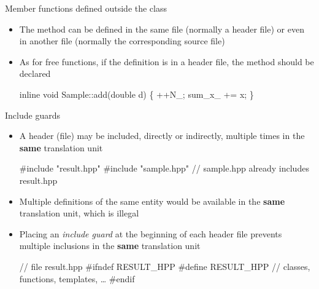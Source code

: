 \begin{frame}[fragile]{Member functions defined outside the class \insertcontinuationtext}

  \begin{itemize}
  \item The method can be defined in the same file (normally a header file) or
    even in another file (normally the corresponding source file)

  \item As for free functions, if the definition is in a header file,
    the method should be declared 

    \begin{codeblock}
\alert{inline} void Sample::add(double d) \{
  ++N_;
  sum_x_ += x;
  \ddd
\}\end{codeblock}

  \end{itemize}

\end{frame}

\begin{frame}[fragile]{Include guards}

  \begin{itemize}[<+->]
  \item A header (file) may be included, directly or indirectly, multiple times
    in the \textbf{same} translation unit
    \begin{codeblock}
#include "result.hpp"
#include "sample.hpp" // sample.hpp already includes result.hpp\end{codeblock}

  \item Multiple definitions of the same entity would be available in the
    \textbf{same} translation unit, which is illegal
  \item Placing an \textit{include guard} at the beginning of each header file
    prevents multiple inclusions in the \textbf{same} translation unit
    \begin{codeblock}
// file result.hpp
#ifndef RESULT_HPP
#define RESULT_HPP
\ddd
// classes, functions, templates, \ldots
\ddd
#endif\end{codeblock}
  \end{itemize}
\end{frame}

